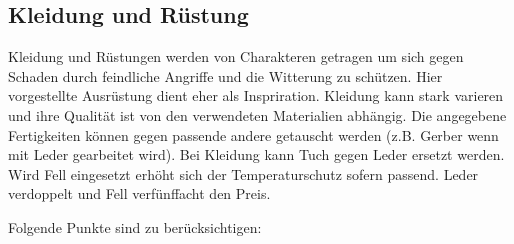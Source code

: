 \documentclass{article}
\begin{document}
\begin{center}
\subsection{Kleidung und Rüstung}
\end{center}

Kleidung und Rüstungen werden von Charakteren getragen um sich gegen Schaden durch feindliche Angriffe und die
Witterung zu schützen. Hier vorgestellte Ausrüstung dient eher als Inspriration. Kleidung kann stark varieren und
ihre Qualität ist von den verwendeten Materialien abhängig. Die angegebene Fertigkeiten können gegen passende andere
getauscht werden (z.B. Gerber wenn mit Leder gearbeitet wird).
Bei Kleidung kann Tuch gegen Leder ersetzt werden. Wird Fell eingesetzt erhöht sich der Temperaturschutz sofern
passend. Leder verdoppelt und Fell verfünffacht den Preis.

Folgende Punkte sind zu berücksichtigen:
\end{document}
